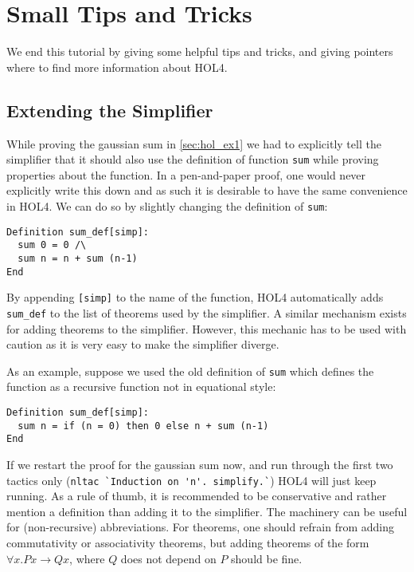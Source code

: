 \section{Small Tips and Tricks}\label{subsec:tipsAndTricks}

We end this tutorial by giving some helpful tips and tricks, and giving pointers
where to find more information about HOL4.

\subsection{Extending the Simplifier}
While proving the gaussian sum in \autoref{sec:hol_ex1} we had to explicitly
tell the simplifier that it should also use the definition of function
\lstinline{sum} while proving properties about the function.
In a pen-and-paper proof, one would never explicitly write this down and as such
it is desirable to have the same convenience in HOL4.
We can do so by slightly changing the definition of \lstinline{sum}:
%
\begin{lstlisting}
Definition sum_def[simp]:
  sum 0 = 0 /\
  sum n = n + sum (n-1)
End
\end{lstlisting}

By appending \lstinline{[simp]} to the name of the function, HOL4 automatically
adds \lstinline{sum_def} to the list of theorems used by the simplifier.
A similar mechanism exists for adding theorems to the simplifier.
However, this mechanic has to be used with caution as it is very easy to make
the simplifier diverge.

As an example, suppose we used the old definition of \lstinline{sum} which
defines the function as a recursive function not in equational style:

\begin{lstlisting}
Definition sum_def[simp]:
  sum n = if (n = 0) then 0 else n + sum (n-1)
End
\end{lstlisting}

If we restart the proof for the gaussian sum now, and run through the first two
tactics only (\lstinline{nltac `Induction on 'n'. simplify.`}) HOL4 will just
keep running.
As a rule of thumb, it is recommended to be conservative and rather mention a
definition than adding it to the simplifier.
The machinery can be useful for (non-recursive) abbreviations.
For theorems, one should refrain from adding commutativity or associativity
theorems, but adding theorems of the form $\forall x. P x \rightarrow Q x$, where
$Q$ does not depend on $P$ should be fine.

